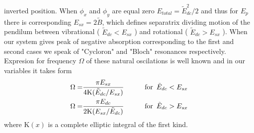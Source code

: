 \documentclass[40pt,letterpaper,physrev]{article}
\begin{document}
    inverted position. When $\phi_x$ and $\phi_y$ are equal zero 
    $E_{total}=\tilde{E}_{dc}^2/2$ and thus for $E_p$ there is 
    corresponding $E_{sx}=2\tilde{B}$, which defines separatrix dividing
    motion of the pendilum between vibrational 
    ( $\tilde{E}_{dc}<E_{sx}$ ) and 
    rotational ( $\tilde{E}_{dc}>E_{sx}$ ).
    When our system gives peak of negative absorption corresponding 
    to the first and second cases we speak of "Cycloron" and 
    "Bloch" resonances respectively. Expresion for frequency 
    $\Omega$ of these natural oscilations is well known and in our 
    variables it takes form
    \begin{alignat}{2}
    \Omega=&\frac{\pi E_{sx}}{4\text{K}(\tilde{E}_{dc}/E_{sx})} &\qquad \text{for} \enskip \tilde{E}_{dc}<E_{sx}\\
    \Omega=&\frac{\pi E_{dc}}{2\text{K}(E_{sx}/\tilde{E}_{dc})}
     &\qquad \text{for} \enskip \tilde{E}_{dc}>E_{sx}
    \end{alignat}
    where $\text{K}(x)$ is a complete elliptic integral of the 
    first kind.
\end{document}
